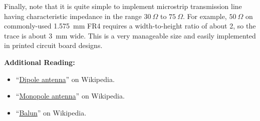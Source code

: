 Finally, note that it is quite simple to implement microstrip 
transmission line having characteristic impedance in the range $30~\Omega$ to $75~\Omega$.  For example, $50~\Omega$ on commonly-used 1.575~mm FR4 
requires a width-to-height ratio of about 2, so the trace is about 3~mm wide.  This is a very manageable size and easily implemented in printed circuit board designs.


{\bf Additional Reading:}
\begin{itemize}
\item ``\href{https://en.wikipedia.org/wiki/Dipole_antenna}{Dipole antenna}'' on Wikipedia.
\item ``\href{https://en.wikipedia.org/wiki/Monopole_antenna}{Monopole antenna}'' on Wikipedia.
\item ``\href{https://en.wikipedia.org/wiki/Balun}{Balun}'' on Wikipedia.
\end{itemize}

